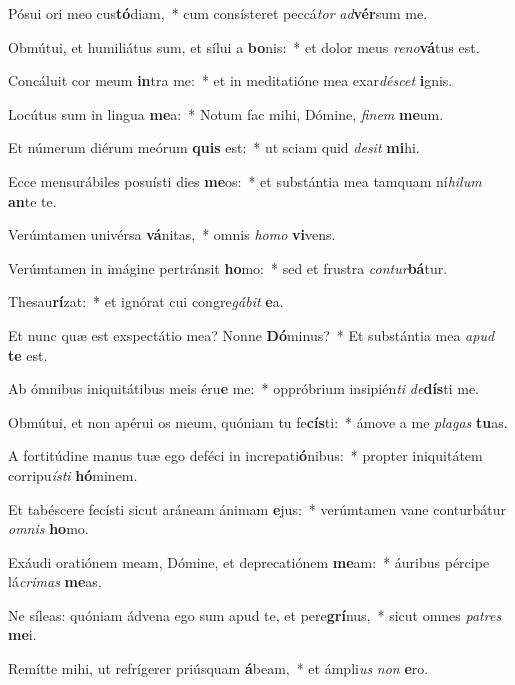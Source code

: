 \item Pósui ori meo cus\textbf{tó}diam,~* cum consísteret peccá\textit{tor} \textit{ad}\textbf{vér}sum me.
\item Obmútui, et humiliátus sum, et sílui a \textbf{bo}nis:~* et dolor meus \textit{re}\textit{no}\textbf{vá}tus est.
\item Concáluit cor meum \textbf{in}tra me:~* et in meditatióne mea exar\textit{dé}\textit{scet} \textbf{i}gnis.
\item Locútus sum in lingua \textbf{me}a:~* Notum fac mihi, Dómine, \textit{fi}\textit{nem} \textbf{me}um.
\item Et númerum diérum meórum \textbf{quis} est:~* ut sciam quid \textit{de}\textit{sit} \textbf{mi}hi.
\item Ecce mensurábiles posuísti dies \textbf{me}os:~* et substántia mea tamquam ní\textit{hi}\textit{lum} \textbf{an}te te.
\item Verúmtamen univérsa \textbf{vá}nitas,~* omnis \textit{ho}\textit{mo} \textbf{vi}vens.
\item Verúmtamen in imágine pertránsit \textbf{ho}mo:~* sed et frustra \textit{con}\textit{tur}\textbf{bá}tur.
\item Thesau\textbf{rí}zat:~* et ignórat cui congre\textit{gá}\textit{bit} \textbf{e}a.
\item Et nunc quæ est exspectátio mea? Nonne \textbf{Dó}minus?~* Et substántia mea \textit{a}\textit{pud} \textbf{te} est.
\item Ab ómnibus iniquitátibus meis éru\textbf{e} me:~* oppróbrium insipién\textit{ti} \textit{de}\textbf{dís}ti me.
\item Obmútui, et non apérui os meum, quóniam tu fe\textbf{cís}ti:~* ámove a me \textit{pla}\textit{gas} \textbf{tu}as.
\item A fortitúdine manus tuæ ego deféci in increpati\textbf{ó}nibus:~* propter iniquitátem corripu\textit{ís}\textit{ti} \textbf{hó}minem.
\item Et tabéscere fecísti sicut aráneam ánimam \textbf{e}jus:~* verúmtamen vane conturbátur \textit{om}\textit{nis} \textbf{ho}mo.
\item Exáudi oratiónem meam, Dómine, et deprecatiónem \textbf{me}am:~* áuribus pércipe lá\textit{cri}\textit{mas} \textbf{me}as.
\item Ne síleas: quóniam ádvena ego sum apud te, et pere\textbf{grí}nus,~* sicut omnes \textit{pa}\textit{tres} \textbf{me}i.
\item Remítte mihi, ut refrígerer priúsquam \textbf{á}beam,~* et ámpli\textit{us} \textit{non} \textbf{e}ro.
